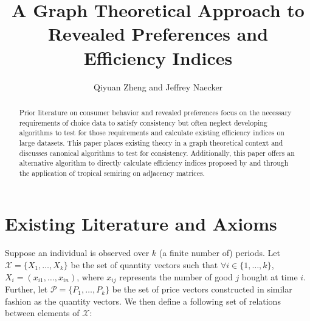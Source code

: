 \documentclass{article} %
\title{A Graph Theoretical Approach to Revealed Preferences and Efficiency Indices}
\author{Qiyuan Zheng and Jeffrey Naecker}
\theoremstyle{style1}
\theoremstyle{example}
\begin{document}
\maketitle

\begin{abstract}
Prior literature on consumer behavior and revealed preferences focus on the necessary requirements of choice data to satisfy consistency but often neglect developing algorithms to test for those requirements and calculate existing efficiency indices on large datasets. This paper places existing theory in a graph theoretical context and discusses canonical algorithms to test for consistency. Additionally, this paper offers an alternative algorithm to directly calculate efficiency indices proposed by \citet{Afriat1967The-Construction-of-Utility-Functions-from-Expenditure-Data} and \citet{Varian1990Goodness-of-fit-in-optimizing-models} through the application of tropical semiring on adjacency matrices.
\end{abstract}

\section{Existing Literature and Axioms}

Suppose an individual is observed over $k$ (a finite number of) periods. Let $\mathcal{X}=\{X_1,\ldots,X_k\}$ be the set of quantity vectors such that $\forall i\in\{1,\ldots,k\}$, $X_i=(x_{i1},\ldots,x_{in})$, where $x_{ij}$ represents the number of good $j$ bought at time $i$. Further, let $\mathcal{P}=\{P_1,\ldots,P_k\}$ be the set of price vectors constructed in similar fashion as the quantity vectors. We then define a following set of relations between elements of $\mathcal{X}$:
\end{document}
